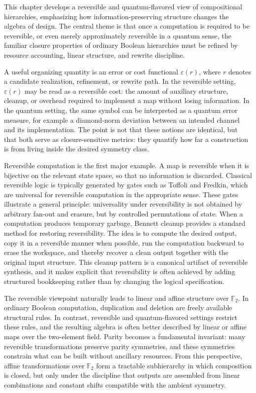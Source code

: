 This chapter develops a reversible and quantum-flavored view of compositional hierarchies, emphasizing how information-preserving structure changes the algebra of design. The central theme is that once a computation is required to be reversible, or even merely approximately reversible in a quantum sense, the familiar closure properties of ordinary Boolean hierarchies must be refined by resource accounting, linear structure, and rewrite discipline.

A useful organizing quantity is an error or cost functional \(\varepsilon(r)\), where \(r\) denotes a candidate realization, refinement, or rewrite path. In the reversible setting, \(\varepsilon(r)\) may be read as a reversible cost: the amount of auxiliary structure, cleanup, or overhead required to implement a map without losing information. In the quantum setting, the same symbol can be interpreted as a quantum error measure, for example a diamond-norm deviation between an intended channel and its implementation. The point is not that these notions are identical, but that both serve as closure-sensitive metrics: they quantify how far a construction is from living inside the desired symmetry class.

Reversible computation is the first major example. A map is reversible when it is bijective on the relevant state space, so that no information is discarded. Classical reversible logic is typically generated by gates such as Toffoli and Fredkin, which are universal for reversible computation in the appropriate sense. These gates illustrate a general principle: universality under reversibility is not obtained by arbitrary fan-out and erasure, but by controlled permutations of state. When a computation produces temporary garbage, Bennett cleanup provides a standard method for restoring reversibility. The idea is to compute the desired output, copy it in a reversible manner when possible, run the computation backward to erase the workspace, and thereby recover a clean output together with the original input structure. This cleanup pattern is a canonical artifact of reversible synthesis, and it makes explicit that reversibility is often achieved by adding structured bookkeeping rather than by changing the logical specification.

The reversible viewpoint naturally leads to linear and affine structure over \(\mathbb{F}_2\). In ordinary Boolean computation, duplication and deletion are freely available structural rules. In contrast, reversible and quantum-flavored settings restrict these rules, and the resulting algebra is often better described by linear or affine maps over the two-element field. Parity becomes a fundamental invariant: many reversible transformations preserve parity symmetries, and these symmetries constrain what can be built without ancillary resources. From this perspective, affine transformations over \(\mathbb{F}_2\) form a tractable subhierarchy in which composition is closed, but only under the discipline that outputs are assembled from linear combinations and constant shifts compatible with the ambient symmetry.

